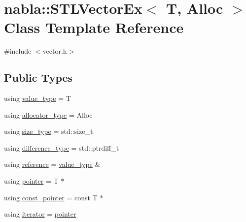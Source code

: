 \hypertarget{classnabla_1_1_s_t_l_vector_ex}{}\section{nabla\+::S\+T\+L\+Vector\+Ex$<$ T, Alloc $>$ Class Template Reference}
\label{classnabla_1_1_s_t_l_vector_ex}


{\ttfamily \#include $<$vector.\+h$>$}

\subsection*{Public Types}
\begin{DoxyCompactItemize}
\item 
using \mbox{\hyperlink{classnabla_1_1_s_t_l_vector_ex_a6af5809443fb78a0fe7321ff93e2ad4c}{value\+\_\+type}} = T
\item 
using \mbox{\hyperlink{classnabla_1_1_s_t_l_vector_ex_a1a55b1145a1d99efca09cce9b2eac20f}{allocator\+\_\+type}} = Alloc
\item 
using \mbox{\hyperlink{classnabla_1_1_s_t_l_vector_ex_a288a7552f71d4e0cbeb12e6a6d5e7fd3}{size\+\_\+type}} = std\+::size\+\_\+t
\item 
using \mbox{\hyperlink{classnabla_1_1_s_t_l_vector_ex_a17cbfc53d4b35559911b1ef501629da4}{difference\+\_\+type}} = std\+::ptrdiff\+\_\+t
\item 
using \mbox{\hyperlink{classnabla_1_1_s_t_l_vector_ex_a6adf5d87234352c139af2d48f4787ed5}{reference}} = \mbox{\hyperlink{classnabla_1_1_s_t_l_vector_ex_a6af5809443fb78a0fe7321ff93e2ad4c}{value\+\_\+type}} \&
\item 
using \mbox{\hyperlink{classnabla_1_1_s_t_l_vector_ex_a396f1267c3ea9874a98905cad4137af3}{pointer}} = T $\ast$
\item 
using \mbox{\hyperlink{classnabla_1_1_s_t_l_vector_ex_a66d8e0fc1681c6b0809319057c890f1e}{const\+\_\+pointer}} = const T $\ast$
\item 
using \mbox{\hyperlink{classnabla_1_1_s_t_l_vector_ex_a4bd3bc9bbe369d76e958f3180c22f40b}{iterator}} = \mbox{\hyperlink{classnabla_1_1_s_t_l_vector_ex_a396f1267c3ea9874a98905cad4137af3}{pointer}}
\end{DoxyCompactItemize}
